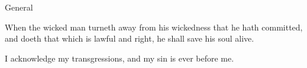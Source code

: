 \begin{multicols}{2}

\centerline{\color{RubricRed}\small%
General}
\par\noindent
    When the wicked man turneth away from his wickedness that he hath committed, and doeth that which is lawful and right, he shall save his soul alive.\par

    I acknowledge my transgressions, and my sin is ever before me.\par


\end{multicols}
